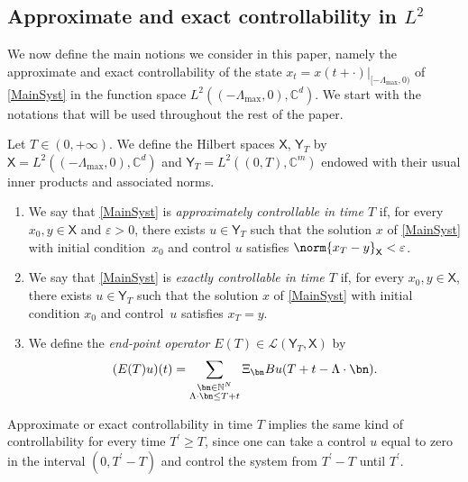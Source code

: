 \subsection{Approximate and exact controllability in \texorpdfstring{$L^2$}{L2}}
\label{SecControlL2}

We now define the main \hbox{notions} we consider in this paper, namely the approximate and exact controllability of the state $x_t = \left.x(t + \cdot)\right|_{[-\Lambda_{\max}, 0)}$ of \eqref{MainSyst} in the function space $L^2((-\Lambda_{\max}, 0), \mathbb C^d)$. We start with the notations that will be used throughout the rest of the paper.

\begin{defi}
\label{DefiContrExactApprox}
Let $T \in (0, +\infty)$. We define the Hilbert spaces $\mathsf X$, $\mathsf Y_T$ by $\mathsf X = L^2((-\Lambda_{\max}, 0), \mathbb C^d)$ and $\mathsf Y_T = L^2((0, T), \mathbb C^m)$ endowed with their usual inner products and associated norms.
\begin{enumerate}
\item We say that \eqref{MainSyst} is \emph{approximately controllable in time $T$} if, for every $x_0, y \in \mathsf X$ and $\varepsilon > 0$, there exists $u \in \mathsf Y_T$ such that the solution $x$ of \eqref{MainSyst} with initial condition~$x_0$ and control $u$ satisfies $\norm{x_T - y}_{\mathsf X} < \varepsilon$.

\item We say that \eqref{MainSyst} is \emph{exactly controllable in time $T$} if, for every $x_0, y \in \mathsf X$, there exists $u \in \mathsf Y_T$ such that the solution $x$ of \eqref{MainSyst} with initial condition $x_0$ and control~$u$ satisfies $x_T = y$.

\item We define the \emph{end-point operator} $E(T) \in \mathcal L(\mathsf Y_T, \mathsf X)$ by\vspace*{-3pt}
\begin{equation}
\label{EqDefET}
(E(T)u)(t) = \sum_{\substack{\bn \in \mathbb N^N \\ \Lambda \cdot \bn \leq T + t}} \Xi_{\bn} B u(T + t - \Lambda \cdot \bn).
\end{equation}
\end{enumerate}
\end{defi}

Approximate or exact controllability in time $T$ implies the same kind of controllability for every time $T^\prime \geq T$, since one can take a control $u$ equal to zero in the interval $(0, T^\prime - T)$ and control the system from $T^\prime - T$ until $T^\prime$.


